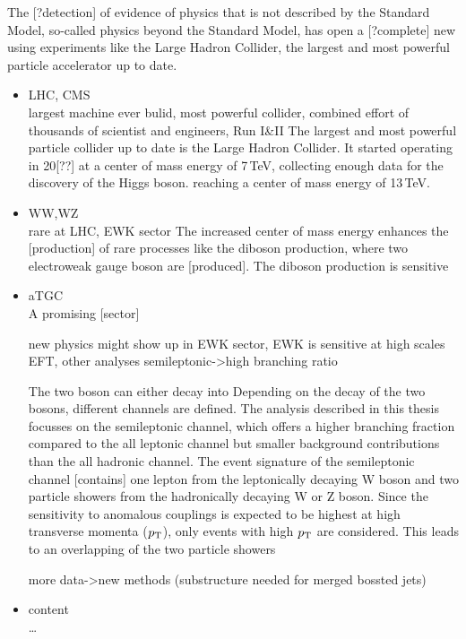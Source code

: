 The [?detection] of evidence of physics that is not described by the Standard Model, so-called physics beyond the Standard Model, has open a [?complete] new 
using experiments like the Large Hadron Collider, the largest and most powerful particle accelerator up to date.
\begin{itemize}
\item{LHC, CMS}\\
largest machine ever bulid, most powerful collider, combined effort of thousands of scientist and engineers, Run I&II
The largest and most powerful particle collider up to date is the Large Hadron Collider. It started operating in 20[??] at a center of mass energy of 7\,TeV, collecting enough data for the discovery of the Higgs boson. 
reaching a center of mass energy of 13\,TeV.

\item{WW,WZ}\\
rare at LHC, EWK sector
The increased center of mass energy enhances the [production] of rare processes like the diboson production, where two electroweak gauge boson are [produced]. The diboson production is sensitive 

\item{aTGC}\\
A promising [sector] 

new physics might show up in EWK sector, EWK is sensitive at high scales EFT, other analyses
semileptonic->high branching ratio

The two boson can either decay into 
Depending on the decay of the two bosons, different channels are defined. 
The analysis described in this thesis focusses on the semileptonic channel, which offers a higher branching fraction compared to the all leptonic channel but smaller background contributions than the all hadronic channel. The event signature of the semileptonic channel [contains] one lepton from the leptonically decaying W boson and two particle showers from the hadronically decaying W or Z boson. Since the sensitivity to anomalous couplings is expected to be highest at high transverse momenta ($p_{\rm T}$), only events with high $p_{\rm T}$ are considered. This leads to an overlapping of the two particle showers


more data->new methods (substructure needed for merged bossted jets)


\item{content}\\
\dots
\end{itemize}
